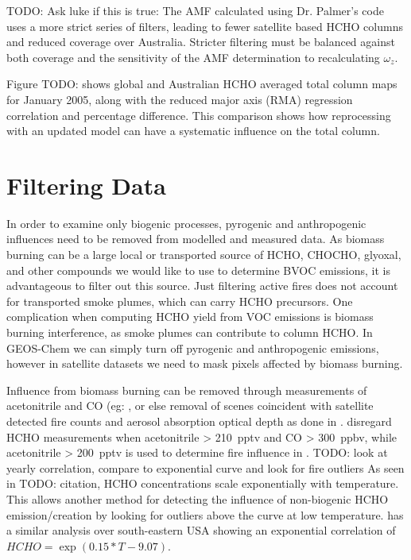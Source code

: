     TODO: Ask luke if this is true:
    The AMF calculated using Dr. Palmer's code uses a more strict series of filters, leading to fewer satellite based HCHO columns and reduced coverage over Australia.
    Stricter filtering must be balanced against both coverage and the sensitivity of the AMF determination to recalculating $\omega_z$.
  
    Figure TODO: shows global and Australian HCHO averaged total column maps for January 2005, along with the reduced major axis (RMA) regression correlation and percentage difference.
    This comparison shows how reprocessing with an updated model can have a systematic influence on the total column.

\section{Filtering Data}
  \label{Model:Filter}
  
  In order to examine only biogenic processes, pyrogenic and anthropogenic influences need to be removed from modelled and measured data.
  As biomass burning can be a large local or transported source of HCHO, CHOCHO, glyoxal, and other compounds we would like to use to determine BVOC emissions, it is advantageous to filter out this source.
  Just filtering active fires does not account for transported smoke plumes, which can carry HCHO precursors.
  One complication when computing HCHO yield from VOC emissions is biomass burning interference, as smoke plumes can contribute to column HCHO.
  In GEOS-Chem we can simply turn off pyrogenic and anthropogenic emissions, however in satellite datasets we need to mask pixels affected by biomass burning.
  
  Influence from biomass burning can be removed through measurements of acetonitrile and CO (eg: \parencite{Wolfe2016, Miller2017}, or else removal of scenes coincident with satellite detected fire counts and aerosol absorption optical depth as done in \textcite{Marais2014}.
  \textcite{Wolfe2016} disregard HCHO measurements when acetonitrile > 210~pptv and CO > 300~ppbv, while acetonitrile > 200~pptv is used to determine fire influence in \textcite{Miller2017}.
  TODO: look at yearly correlation, compare to exponential curve and look for fire outliers
  As seen in TODO: citation, HCHO concentrations scale exponentially with temperature.
  This allows another method for detecting the influence of non-biogenic HCHO emission/creation by looking for outliers above the curve at low temperature.
  \textcite{Zhu2013_poster} has a similar analysis over south-eastern USA showing an exponential correlation of ${HCHO} = \exp(0.15*{T}-9.07)$.
  
